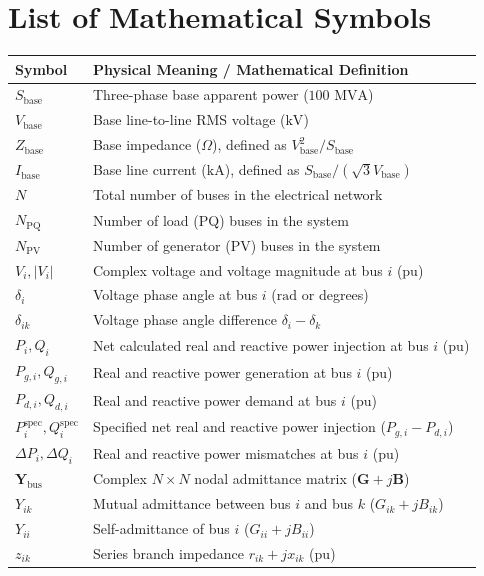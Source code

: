 \documentclass[12pt,a4paper,oneside]{report}
\begin{document}
\section*{List of Mathematical Symbols}
\begin{longtable}{ll}
\toprule
\textbf{Symbol} & \textbf{Physical Meaning / Mathematical Definition} \\
\midrule
$S_{\text{base}}$ & Three-phase base apparent power ($100\text{ MVA}$) \\
$V_{\text{base}}$ & Base line-to-line RMS voltage ($\text{kV}$) \\
$Z_{\text{base}}$ & Base impedance ($\Omega$), defined as $V_{\text{base}}^2 / S_{\text{base}}$ \\
$I_{\text{base}}$ & Base line current ($\text{kA}$), defined as $S_{\text{base}} / (\sqrt{3} V_{\text{base}})$ \\
$N$ & Total number of buses in the electrical network \\
$N_{\text{PQ}}$ & Number of load (PQ) buses in the system \\
$N_{\text{PV}}$ & Number of generator (PV) buses in the system \\
$V_i, |V_i|$ & Complex voltage and voltage magnitude at bus $i$ ($\text{pu}$) \\
$\delta_i$ & Voltage phase angle at bus $i$ ($\text{rad}$ or degrees) \\
$\delta_{ik}$ & Voltage phase angle difference $\delta_i - \delta_k$ \\
$P_i, Q_i$ & Net calculated real and reactive power injection at bus $i$ ($\text{pu}$) \\
$P_{g,i}, Q_{g,i}$ & Real and reactive power generation at bus $i$ ($\text{pu}$) \\
$P_{d,i}, Q_{d,i}$ & Real and reactive power demand at bus $i$ ($\text{pu}$) \\
$P_i^{\text{spec}}, Q_i^{\text{spec}}$ & Specified net real and reactive power injection ($P_{g,i} - P_{d,i}$) \\
$\Delta P_i, \Delta Q_i$ & Real and reactive power mismatches at bus $i$ ($\text{pu}$) \\
$\mathbf{Y}_{\text{bus}}$ & Complex $N \times N$ nodal admittance matrix ($\mathbf{G} + j\mathbf{B}$) \\
$Y_{ik}$ & Mutual admittance between bus $i$ and bus $k$ ($G_{ik} + jB_{ik}$) \\
$Y_{ii}$ & Self-admittance of bus $i$ ($G_{ii} + jB_{ii}$) \\
$z_{ik}$ & Series branch impedance $r_{ik} + jx_{ik}$ ($\text{pu}$) \\

\end{longtable}
\end{document}
